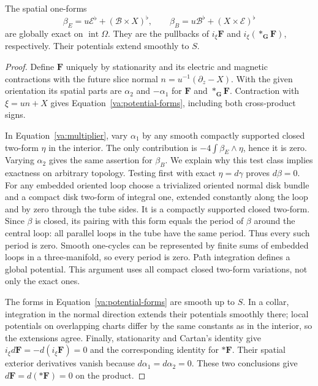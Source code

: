 \begin{lemma}\label{va:potentials}
The spatial one-forms
\begin{equation}\label{va:potential-forms}
 \beta_E=u\mathcal E^\flat+(\mathcal B\times X)^\flat,
 \qquad
 \beta_B=u\mathcal B^\flat+(X\times\mathcal E)^\flat
\end{equation}
are globally exact on \(\operatorname{int}\Omega\).  They are the
pullbacks of \(i_\xi\mathbf F\) and
\(i_\xi(*_{\mathbf G}\mathbf F)\), respectively.  Their potentials
extend smoothly to \(S\).
\end{lemma}
\begin{proof}
Define \(\mathbf F\) uniquely by stationarity and its electric and
magnetic contractions with the future slice normal
\(n=u^{-1}(\partial_z-X)\).  With the given orientation its spatial
parts are \(\alpha_2\) and \(-\alpha_1\) for \(\mathbf F\) and
\(*_{\mathbf G}\mathbf F\).  Contraction with \(\xi=un+X\) gives
Equation~\eqref{va:potential-forms}, including both cross-product signs.

In Equation~\eqref{va:multiplier}, vary \(\alpha_1\) by any smooth
compactly supported closed two-form \(\eta\) in the interior.  The
only contribution is
\(-4\int\beta_E\wedge\eta\), hence it is zero.  Varying
\(\alpha_2\) gives the same assertion for \(\beta_B\).  We explain
why this test class implies exactness on arbitrary topology.  Testing
first with exact \(\eta=d\gamma\) proves \(d\beta=0\).
For any embedded oriented loop choose a trivialized oriented normal
disk bundle and a compact disk two-form of integral one, extended
constantly along the loop and by zero through the tube sides.  It is
a compactly supported closed two-form.  Since \(\beta\) is closed,
its pairing with this form equals the period of \(\beta\) around
the central loop: all parallel loops in the tube have the same period.
Thus every such period is zero.  Smooth one-cycles can be represented
by finite sums of embedded loops in a three-manifold, so every period
is zero.  Path integration defines a global potential.  This argument
uses all compact closed two-form variations, not only the exact ones.

The forms in Equation~\eqref{va:potential-forms} are smooth up to
\(S\).  In a collar, integration in the normal direction extends their
potentials smoothly there; local potentials on overlapping charts
differ by the same constants as in the interior, so the extensions
agree.  Finally, stationarity and Cartan's identity give
\(i_\xi d\mathbf F= -d(i_\xi\mathbf F)=0\) and the corresponding
identity for \(*\mathbf F\).  Their spatial exterior derivatives
vanish because \(d\alpha_1=d\alpha_2=0\).  These two conclusions
give \(d\mathbf F=d(*\mathbf F)=0\) on the product.
\end{proof}

